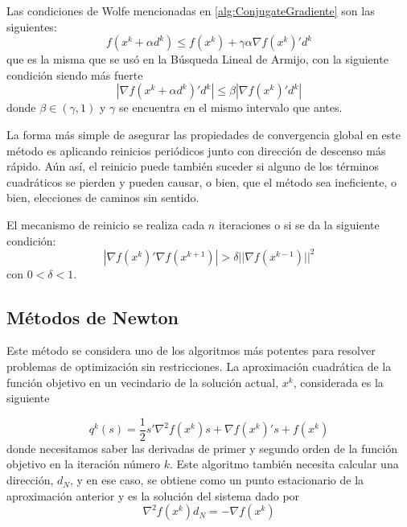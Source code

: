 Las condiciones de Wolfe mencionadas en \ref{alg:ConjugateGradiente} son las siguientes:
\begin{equation}
f(x^k + \alpha d^k) \leq f(x^k) + \gamma\alpha\nabla f(x^k)'d^k
\label{eq:4.20}
\end{equation}
que es la misma que se usó en la Búsqueda Lineal de Armijo, con la siguiente condición siendo más fuerte
\begin{equation}
|\nabla f(x^k+\alpha d^k)'d^k| \leq \beta |\nabla f(x^k)'d^k|
\label{eq:4.21}
\end{equation}
donde $\beta\in (\gamma,1)$ y $\gamma$ se encuentra en el mismo intervalo que antes.

La forma más simple de asegurar las propiedades de convergencia global en este método es aplicando reinicios periódicos junto con dirección de descenso más rápido. 
Aún así, el reinicio puede también suceder si alguno de los términos cuadráticos se pierden y pueden causar, o bien, que el método sea ineficiente, o bien, elecciones de caminos sin sentido.

El mecanismo de reinicio se realiza cada $n$ iteraciones o si se da la siguiente condición:
\begin{equation*}
|\nabla f(x^k)'\nabla f(x^{k+1})| > \delta ||\nabla f(x^{k-1})||^2
\end{equation*}
con $0 < \delta < 1$.


\subsection{Métodos de Newton}

Este método se considera uno de los algoritmos más potentes para resolver problemas de optimización sin restricciones. 
La aproximación cuadrática de la función objetivo en un vecindario de la solución actual, $x^k$, considerada es la siguiente

\begin{equation*}
q^k(s) = \dfrac{1}{2}s'\nabla^2f(x^k)s+\nabla f(x^k)'s+f(x^k) 
\end{equation*}
donde necesitamos saber las derivadas de primer y segundo orden de la función objetivo en la iteración número $k$. 
Este algoritmo también necesita calcular una dirección, $d_N$, y en ese caso, se obtiene como un punto estacionario de la aproximación anterior y es la solución del sistema dado por
\begin{equation}
\nabla^2 f(x^k)d_N = -\nabla f(x^k)
\label{eq:4.22}
\end{equation}

